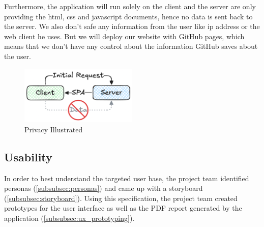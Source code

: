 Furthermore, the application will run solely on the client and the server are only providing the html,
css and javascript documents, hence no data is sent back to the server.
We also don't safe any information from the user like ip address or the web client he uses.
But we will deploy our website with GitHub pages, which means that we don't have any control about the information GitHub saves about the user.

\begin{figure}[H]
    \centering
    \includegraphics[width=0.5\textwidth]{../assets/privacy_illustrated.png}
    \caption{Privacy Illustrated}\label{fig:privacy_illustrated}
\end{figure}

\subsection{Usability}\label{subsec:usability}
In order to best understand the targeted user base, the project team identified personas (\ref{subsubsec:personas}) and came up with a storyboard (\ref{subsubsec:storyboard}).
Using this specification, the project team created prototypes for the user interface as well as the PDF report generated by the application (\ref{subsubsec:ux_prototyping}).

